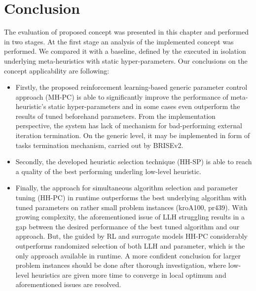 \section{Conclusion}\label{eval: conclution}
The evaluation of proposed concept was presented in this chapter and performed in two stages. At the first stage an analysis of the implemented concept was performed. We compared it with a baseline, defined by the executed in isolation underlying meta-heuristics with static hyper-parameters. Our conclusions on the concept applicability are following:
\begin{itemize}
	\item Firstly, the proposed reinforcement learning-based generic parameter control approach (MH-PC) is able to significantly improve the performance of meta-heuristic's static hyper-parameters and in some cases even outperform the results of tuned beforehand parameters. From the implementation perspective, the system has lack of mechanism for bad-performing external iteration termination. On the generic level, it may be implemented in form of tasks termination mechanism, carried out by BRISEv2.
	
	\item Secondly, the developed heuristic selection technique (HH-SP) is able to reach a quality of the best performing underling low-level heuristic. 
	
	\item Finally, the approach for simultaneous algorithm selection and parameter tuning (HH-PC) in runtime outperforms the best underlying algorithm with tuned parameters on rather small problem instances (kroA100, pr439). With growing complexity, the aforementioned issue of LLH struggling results in a gap between the desired performance of the best tuned algorithm and our approach. But, the guided by RL and surrogate models HH-PC considerably outperforms randomized selection of both LLH and parameter, which is the only approach available in runtime. A more confident conclusion for larger problem instances should be done after thorough investigation, where low-level heuristics are given more time to converge in local optimum and aforementioned issues are resolved.
\end{itemize}

